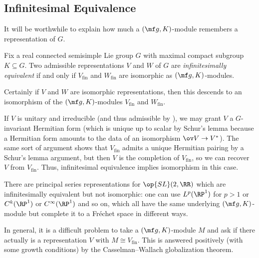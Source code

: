 \documentclass[../notes.tex]{subfiles}
\begin{document}
\subsection{Infinitesimal Equivalence}
It will be worthwhile to explain how much a $(\mf g,K)$-module remembers a representation of $G$.
\begin{definition}
	Fix a real connected semisimple Lie group $G$ with maximal compact subgroup $K\subseteq G$. Two admissible representations $V$ and $W$ of $G$ are \textit{infinitesimally equivalent} if and only if $V_{\mathrm{fin}}$ and $W_{\mathrm{fin}}$ are isomorphic as $(\mf g,K)$-modules.
\end{definition}
\begin{remark}
	Certainly if $V$ and $W$ are isomorphic representations, then this descends to an isomorphism of the $(\mf g,K)$-modules $V_{\mathrm{fin}}$ and $W_{\mathrm{fin}}$.
\end{remark}
\begin{remark}
	If $V$ is unitary and irreducible (and thus admissible by ), we may grant $V$ a $G$-invariant Hermitian form (which is unique up to scalar by Schur's lemma because a Hermitian form amounts to the data of an isomorphism $\ov V\to V^*$). The same sort of argument shows that $V_{\mathrm{fin}}$ admits a unique Hermitian pairing by a Schur's lemma argument, but then $V$ is the completion of $V_{\mathrm{fin}}$, so we can recover $V$ from $V_{\mathrm{fin}}$. Thus, infinitesimal equivalence implies isomorphism in this case.
\end{remark}
\begin{remark}
	There are principal series representations for $\op{SL}(2,\RR)$ which are infinitesimally equivalent but not isomorphic: one can use $L^p(\RP^1)$ for $p>1$ or $C^k(\RP^1)$ or $C^\infty(\RP^1)$ and so on, which all have the same underlying $(\mf g,K)$-module but complete it to a Fr\'echet space in different ways.
\end{remark}
\begin{remark}
	In general, it is a difficult problem to take a $(\mf g,K)$-module $M$ and ask if there actually is a representation $V$ with $M\cong V_{\mathrm{fin}}$. This is answered positively (with some growth conditions) by the Casselman--Wallach globalization theorem.
\end{remark}
\end{document}
